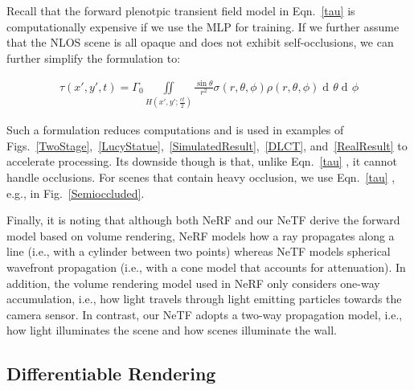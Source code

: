 \documentclass[10pt,journal,compsoc]{IEEEtran}
\DeclareMathOperator{\di}{d\!}
\begin{document}
Recall that the forward plenotpic transient field model in Eqn.~\ref{tau} is computationally expensive if we use the MLP for training. If we further assume that the NLOS scene is all opaque and does not exhibit self-occlusions, we can further simplify the formulation to:

{
\begin{equation}
\begin{split}
    \tau(x', y',t) = \Gamma_{0} \underset{H(x', y';\frac{ct}{2})}{\iint} \frac{\sin{\theta}}{r^{2}} \sigma(r, \theta,\phi) \rho(r, \theta,\phi)  \di{\theta} \di{\phi}
\end{split}
\label{tauSim}
\end{equation}
}

Such a formulation reduces computations and is used in examples of Figs.~\ref{TwoStage},~\ref{LucyStatue},~\ref{SimulatedResult},~\ref{DLCT}, and~\ref{RealResult} to accelerate processing. Its downside though is that, unlike Eqn.~\ref{tau} , it cannot handle occlusions. For scenes that contain heavy occlusion, we use Eqn.~\ref{tau} , e.g., in Fig.~\ref{Semioccluded}. 

Finally, it is noting that although both NeRF and our NeTF derive the forward model based on volume rendering, NeRF models how a ray propagates along a line (i.e., with a cylinder between two points) whereas NeTF models spherical wavefront propagation (i.e., with a cone model that accounts for attenuation). In addition, the volume rendering model used in NeRF only considers one-way accumulation, i.e., how light travels through light emitting particles towards the camera sensor. In contrast, our NeTF adopts a two-way propagation model, i.e., how light illuminates the scene and how scenes illuminate the wall.  

 
\subsection{Differentiable Rendering}
\label{Differential Rendering}
\end{document}
